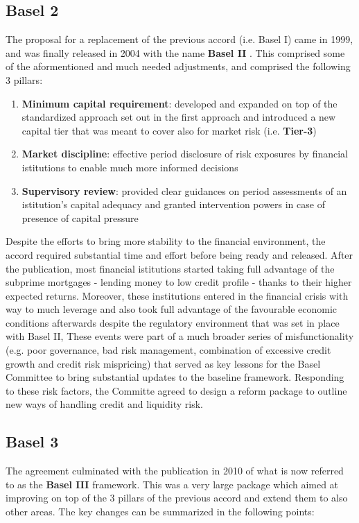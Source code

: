 \documentclass[a4paper,12pt]{article}
\begin{document}
    \subsection[]{Basel 2}
    The proposal for a replacement of the previous accord (i.e. Basel I) came in 1999, and was finally released in 2004 with the name \textbf{Basel II} .
    This comprised some of the aformentioned and much needed adjustments, and comprised the following 3 pillars:

        \begin{enumerate}
            \item \textbf{Minimum capital requirement}: developed and expanded on top of the standardized approach set out in the first approach and introduced a new capital tier that was meant to cover also for market risk (i.e. \textbf{Tier-3})
            \item \textbf{Market discipline}: effective period disclosure of risk exposures by financial istitutions to enable much more informed decisions
            \item \textbf{Supervisory review}: provided clear guidances on period assessments of an istitution's capital adequacy and granted intervention powers in case of presence of capital pressure 
        \end{enumerate}

    Despite the efforts to bring more stability to the financial environment, the accord required substantial time and effort before being ready and released. After the publication,
    most financial istitutions started taking full advantage of the subprime mortgages - lending money to low credit profile - thanks to their higher expected returns. Moreover, these institutions entered in the financial crisis 
    with way to much leverage and also took full advantage of the favourable economic conditions afterwards despite the regulatory environment that was set in place with Basel II,
    These events were part of a much broader series of misfunctionality (e.g. poor governance, bad risk management, combination of excessive credit growth and credit risk mispricing) 
    that served as key lessons for the Basel Committee to bring substantial updates to the baseline framework. Responding to these risk factors, the Committe agreed to design a reform
    package to outline new ways of handling credit and liquidity risk.

    \subsection[]{Basel 3}
    The agreement culminated with the publication in 2010 of what is now referred to as the \textbf{Basel III} framework. This was a very large package which aimed at improving
    on top of the 3 pillars of the previous accord and extend them to also other areas. The key changes can be summarized in the following points:
    
\end{document}
